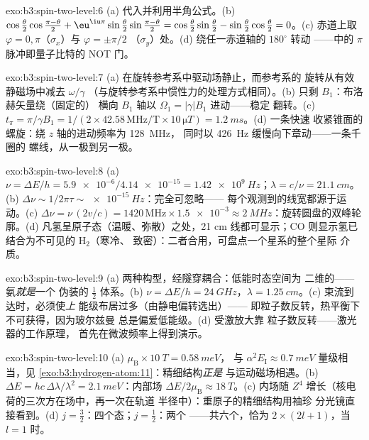 \begin{solution}{exo:b3:spin-two-level:6}
(a) 代入并利用半角公式。(b)
$\cos\tfrac\theta2\cos\tfrac{\pi-\theta}2 +
\eu^{\iu\pi}\sin\tfrac\theta2\sin\tfrac{\pi-\theta}2 =
\cos\tfrac\theta2\sin\tfrac\theta2 -
\sin\tfrac\theta2\cos\tfrac\theta2 = 0$。(c) 赤道上取
$\varphi = 0, \pi$（$\sigma_x$）与 $\varphi = \pm\pi/2$
（$\sigma_y$）处。(d) 绕任一赤道轴的 $180^\circ$ 转动
——中的 $\pi$ 脉冲即量子比特的 NOT 门。
\end{solution}

\begin{solution}{exo:b3:spin-two-level:7}
(a) 在旋转参考系中驱动场静止，而参考系的
旋转从有效静磁场中减去 $\omega/\gamma$
（与旋转参考系中惯性力的处理方式相同）。(b) 只剩
$B_1$：布洛赫矢量绕（固定的）
横向 $B_1$ 轴以 $\Omega_1 = |\gamma|B_1$ 进动——稳定
翻转。(c) $t_\pi = \pi/\gamma B_1 = 1/(2 \times 42.58\,\text{
MHz/T} \times 10\,\unit{\micro T}) = \qty{1.2}{ms}$。(d) 一条快速
收紧锥面的螺旋：绕 $z$ 轴的进动频率为 \qty{128}{MHz}，
同时以 \qty{426}{Hz} 缓慢向下章动——一条千圈的
螺线，从一极到另一极。
\end{solution}

\begin{solution}{exo:b3:spin-two-level:8}
(a) $\nu = \Delta E/h = \num{5.9e-6}/\num{4.14e-15} =
\qty{1.42e9}{Hz}$；$\lambda = c/\nu = \qty{21.1}{cm}$。(b) $\Delta
\nu \sim 1/2\pi\tau \sim \qty{e-15}{Hz}$：完全可忽略——
每个观测到的线宽都源于运动。(c) $\Delta\nu =
\nu\,(2v/c) = 1420\,\text{MHz} \times \num{1.5e-3} \approx
\qty{2}{MHz}$：旋转圆盘的双峰轮廓。(d)
凡氢呈原子态（温暖、弥散）之处，21 cm 线都可显示；CO
则显示氢已结合为不可见的 H$_2$（寒冷、
致密）：二者合用，可盘点一个星系的整个星际
介质。
\end{solution}

\begin{solution}{exo:b3:spin-two-level:9}
(a) 两种构型，经隧穿耦合：低能时态空间为
二维的——氨\emph{就是}一个
伪装的 $\tfrac12$ 体系。(b) $\nu = \Delta E/h = \qty{24}{GHz}$，$\lambda =
\qty{1.25}{cm}$。(c) 束流到达时，必须使\emph{上}
能级布居过多（由静电偏转选出）——
即粒子数反转，热平衡下不可获得，因为玻尔兹曼
总是偏爱低能级。(d) 受激放大靠
粒子数反转——激光器的工作原理，
首先在微波频率上得到演示。
\end{solution}

\begin{solution}{exo:b3:spin-two-level:10}
(a) $\mu_{\text{B}} \times \qty{10}{T} = \qty{0.58}{meV}$，
与 $\alpha^2E_{\text{I}} \approx \qty{0.7}{meV}$ 量级相当，见
\cref{exo:b3:hydrogen-atom:11}：精细结构\emph{正是}
与运动磁场相遇。(b) $\Delta E = hc\,\Delta\lambda/
\lambda^2 = \qty{2.1}{meV}$：内部场 $\Delta E/2\mu_{
\text{B}} \approx \qty{18}{T}$。(c) 内场随
$Z^4$ 增长（核电荷的三次方在场中，再一次在轨道
半径中）：重原子的精细结构用袖珍
分光镜直接看到。(d) $j = \tfrac32$：四个态；$j = \tfrac12$：两个
——共六个，恰为 $2 \times (2l + 1)$，当 $l = 1$ 时。
\end{solution}

